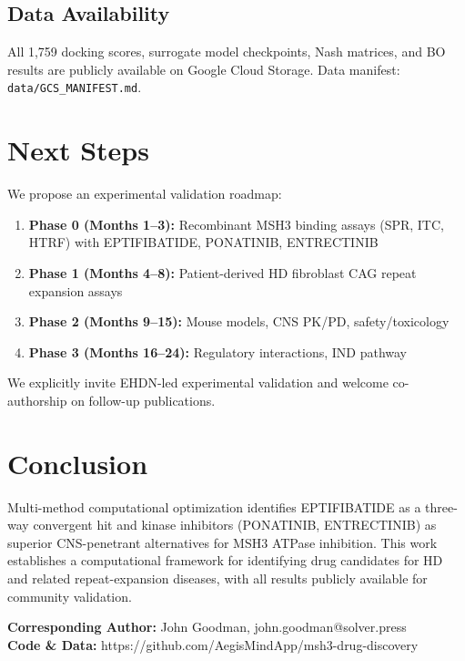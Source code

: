 \documentclass[12pt,a4paper]{article}
\begin{document}
\subsection{Data Availability}

All 1,759 docking scores, surrogate model checkpoints, Nash matrices, and BO results are publicly available on Google Cloud Storage. Data manifest: \texttt{data/GCS\_MANIFEST.md}.

\section{Next Steps}

We propose an experimental validation roadmap:

\begin{enumerate}
\item \textbf{Phase 0 (Months 1--3):} Recombinant MSH3 binding assays (SPR, ITC, HTRF) with EPTIFIBATIDE, PONATINIB, ENTRECTINIB
\item \textbf{Phase 1 (Months 4--8):} Patient-derived HD fibroblast CAG repeat expansion assays
\item \textbf{Phase 2 (Months 9--15):} Mouse models, CNS PK/PD, safety/toxicology
\item \textbf{Phase 3 (Months 16--24):} Regulatory interactions, IND pathway
\end{enumerate}

We explicitly invite EHDN-led experimental validation and welcome co-authorship on follow-up publications.

\section{Conclusion}

Multi-method computational optimization identifies EPTIFIBATIDE as a three-way convergent hit and kinase inhibitors (PONATINIB, ENTRECTINIB) as superior CNS-penetrant alternatives for MSH3 ATPase inhibition. This work establishes a computational framework for identifying drug candidates for HD and related repeat-expansion diseases, with all results publicly available for community validation.

\vspace{2cm}

\begin{center}
\textbf{Corresponding Author:} John Goodman, john.goodman@solver.press \\
\textbf{Code \& Data:} https://github.com/AegisMindApp/msh3-drug-discovery
\end{center}
\end{document}
